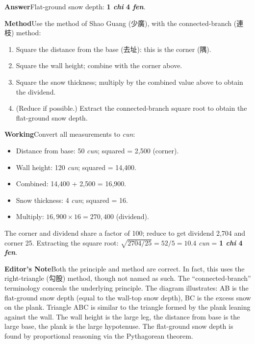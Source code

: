 \documentclass[11pt,a4paper]{article}
\newcommand{\DaEN}{\textbf{\color{headcolor}Answer}}
\newcommand{\ShuEN}{\textbf{\color{headcolor}Method}}
\newcommand{\CaoEN}{\textbf{\color{headcolor}Working}}
\newcommand{\AnEN}{\textbf{\color{headcolor}Editor's Note}}
\begin{document}
\vspace{0.5em}
\DaEN{}\quad Flat-ground snow depth: \textbf{1 \textit{chi} 4 \textit{fen}}.

\vspace{0.5em}
\ShuEN{}\quad Use the method of Shao Guang (少廣), with the connected-branch (連枝) method:
\begin{enumerate}[noitemsep,topsep=0pt]
  \item Square the distance from the base (去址): this is the corner (隅).
  \item Square the wall height; combine with the corner above.
  \item Square the snow thickness; multiply by the combined value above to obtain the dividend.
  \item (Reduce if possible.) Extract the connected-branch square root to obtain the flat-ground snow depth.
\end{enumerate}

\vspace{0.5em}
\CaoEN{}\quad Convert all measurements to \textit{cun}:
\begin{itemize}[noitemsep,topsep=0pt]
  \item Distance from base: 50 \textit{cun}; squared = 2,500 (corner).
  \item Wall height: 120 \textit{cun}; squared = 14,400.
  \item Combined: 14,400 + 2,500 = 16,900.
  \item Snow thickness: 4 \textit{cun}; squared = 16.
  \item Multiply: $16{,}900 \times 16 = 270{,}400$ (dividend).
\end{itemize}
The corner and dividend share a factor of 100; reduce to get dividend 2,704 and corner 25. Extracting the square root: $\sqrt{2704/25} = 52/5 = 10.4$ \textit{cun} = \textbf{1 \textit{chi} 4 \textit{fen}}.

\vspace{0.5em}
\AnEN{}\quad Both the principle and method are correct. In fact, this uses the right-triangle (勾股) method, though not named as such. The ``connected-branch'' terminology conceals the underlying principle. The diagram illustrates: AB is the flat-ground snow depth (equal to the wall-top snow depth), BC is the excess snow on the plank. Triangle ABC is similar to the triangle formed by the plank leaning against the wall. The wall height is the large leg, the distance from base is the large base, the plank is the large hypotenuse. The flat-ground snow depth is found by proportional reasoning via the Pythagorean theorem.
\end{document}

